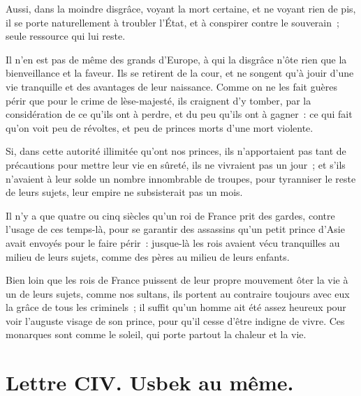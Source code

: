 \documentclass[french,twoside]{book} %
\newcommand{\dateline}[1]{\medskip{\RaggedLeft{#1}\par}\bigskip}
\begin{document}
Aussi, dans la moindre disgrâce, voyant la mort certaine, et ne voyant rien de pis, il se porte naturellement à troubler l’État, et à conspirer contre le souverain ; seule ressource qui lui reste.\par
Il n’en est pas de même des grands d’Europe, à qui la disgrâce n’ôte rien que la bienveillance et la faveur. Ils se retirent de la cour, et ne songent qu’à jouir d’une vie tranquille et des avantages de leur naissance. Comme on ne les fait guères périr que pour le crime de lèse-majesté, ils craignent d’y tomber, par la considération de ce qu’ils ont à perdre, et du peu qu’ils ont à gagner : ce qui fait qu’on voit peu de révoltes, et peu de princes morts d’une mort violente.\par
Si, dans cette autorité illimitée qu’ont nos princes, ils n’apportaient pas tant de précautions pour mettre leur vie en sûreté, ils ne vivraient pas un jour ; et s’ils n’avaient à leur solde un nombre innombrable de troupes, pour tyranniser le reste de leurs sujets, leur empire ne subsisterait pas un mois.\par
Il n’y a que quatre ou cinq siècles qu’un roi de France prit des gardes, contre l’usage de ces temps-là, pour se garantir des assassins qu’un petit prince d’Asie avait envoyés pour le faire périr : jusque-là les rois avaient vécu tranquilles au milieu de leurs sujets, comme des pères au milieu de leurs enfants.\par
Bien loin que les rois de France puissent de leur propre mouvement ôter la vie à un de leurs sujets, comme nos sultans, ils portent au contraire toujours avec eux la grâce de tous les criminels ; il suffit qu’un homme ait été assez heureux pour voir l’auguste visage de son prince, pour qu’il cesse d’être indigne de vivre. Ces monarques sont comme le soleil, qui porte partout la chaleur et la vie.\par

\dateline{De Paris, le 8 de la lune de Rebiab 2, 1717.}
\section[{Lettre CIV. Usbek au même.}]{Lettre CIV. Usbek au même.}\renewcommand{\leftmark}{Lettre CIV. Usbek au même.}
\end{document}
